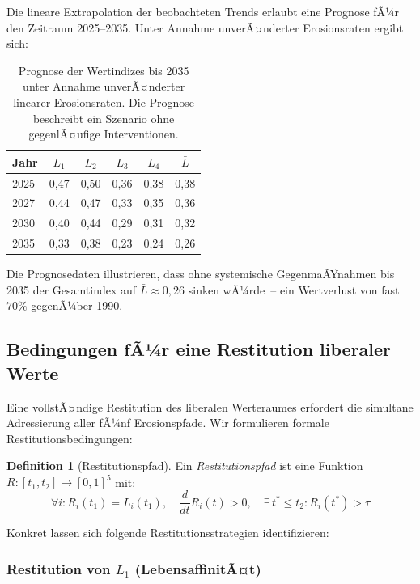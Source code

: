﻿\documentclass[a4paper,12pt]{article}
\theoremstyle{definition}
\newtheorem{definition}{Definition}
\begin{document}
Die lineare Extrapolation der beobachteten Trends erlaubt eine Prognose fÃ¼r den Zeitraum 2025--2035. Unter Annahme unverÃ¤nderter Erosionsraten ergibt sich:

\begin{table}[h!]
\centering
\renewcommand{\arraystretch}{1.25}
\begin{tabular}{lccccc}
\toprule
\textbf{Jahr} & $L_1$ & $L_2$ & $L_3$ & $L_4$ & $\bar{L}$ \\
\midrule
2025 & 0{,}47 & 0{,}50 & 0{,}36 & 0{,}38 & 0{,}38 \\
2027 & 0{,}44 & 0{,}47 & 0{,}33 & 0{,}35 & 0{,}36 \\
2030 & 0{,}40 & 0{,}44 & 0{,}29 & 0{,}31 & 0{,}32 \\
2035 & 0{,}33 & 0{,}38 & 0{,}23 & 0{,}24 & 0{,}26 \\
\bottomrule
\end{tabular}
\caption{Prognose der Wertindizes bis 2035 unter Annahme unverÃ¤nderter linearer Erosionsraten. Die Prognose beschreibt ein Szenario ohne gegenlÃ¤ufige Interventionen.}
\label{tab:prognose}
\end{table}

Die Prognosedaten illustrieren, dass ohne systemische GegenmaÃŸnahmen bis 2035 der Gesamtindex auf $\bar{L} \approx 0{,}26$ sinken wÃ¼rde~-- ein Wertverlust von fast $70\%$ gegenÃ¼ber 1990.

\subsection{Bedingungen fÃ¼r eine Restitution liberaler Werte}

Eine vollstÃ¤ndige Restitution des liberalen Werteraumes erfordert die simultane Adressierung aller fÃ¼nf Erosionspfade. Wir formulieren formale Restitutionsbedingungen:

\begin{definition}[Restitutionspfad]
Ein \emph{Restitutionspfad} ist eine Funktion $R: [t_1, t_2] \to [0,1]^5$ mit:
\[
\forall i: R_i(t_1) = L_i(t_1), \quad \frac{d}{dt}R_i(t) > 0, \quad \exists\, t^* \leq t_2: R_i(t^*) > \tau
\]
\end{definition}

Konkret lassen sich folgende Restitutionsstrategien identifizieren:

\subsubsection{Restitution von $L_1$ (LebensaffinitÃ¤t)}
\end{document}
